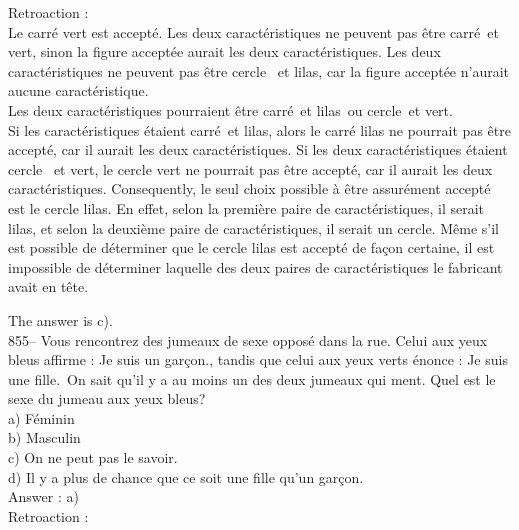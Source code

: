 ﻿\documentclass[letterpaper, 12pt]{article}
\begin{document}
Retroaction : \\
Le carr\'e vert est accept\'e.  Les deux caract\'eristiques ne
peuvent pas \^etre \og carr\'e\fg\ et \og vert\fg , sinon la figure
accept\'ee aurait les deux caract\'eristiques.  Les deux
caract\'eristiques ne peuvent pas \^etre \og cercle \fg\ et \og
lilas\fg , car la figure accept\'ee n'aurait aucune caract\'eristique. \\

Les deux caract\'eristiques pourraient \^etre \og carr\'e\fg\ et
\og lilas\fg\ ou \og cercle\fg\ et \og vert\fg.\\
Si les caract\'eristiques \'etaient \og carr\'e\fg\ et \og lilas\fg,
alors le carr\'e lilas ne pourrait pas \^etre accept\'e, car il
aurait les deux caract\'eristiques. Si les deux caract\'eristiques
\'etaient \og cercle \fg\ et \og vert\fg , le cercle vert ne
pourrait pas \^etre accept\'e, car il aurait les deux
caract\'eristiques. Consequently, le seul choix possible \`a
\^etre assur\'ement accept\'e est le cercle lilas.  En effet, selon
la premi\`ere paire de caract\'eristiques, il serait lilas, et selon
la deuxi\`eme paire de caract\'eristiques, il serait un cercle.
M\^eme s'il est possible de d\'eterminer que le cercle lilas est
accept\'e de fa\c con certaine, il est impossible de d\'eterminer
laquelle des deux paires de caract\'eristiques le fabricant avait en
t\^ete.

The answer is c).\\

855-- Vous rencontrez des jumeaux de sexe oppos\'e dans la rue.
Celui aux yeux bleus affirme : \og Je suis un gar\c con.\fg , tandis
que celui aux yeux verts \'enonce : \og Je suis une fille.\fg\  On
sait qu'il y a au moins un des deux jumeaux qui ment.  Quel est le
sexe du jumeau aux yeux bleus?\\
a) F\'eminin\\
b) Masculin\\
c) On ne peut pas le savoir.\\
d) Il y a plus de chance que ce soit une fille qu'un gar\c con.\\

Answer : a)\\

Retroaction : \\
\end{document}
